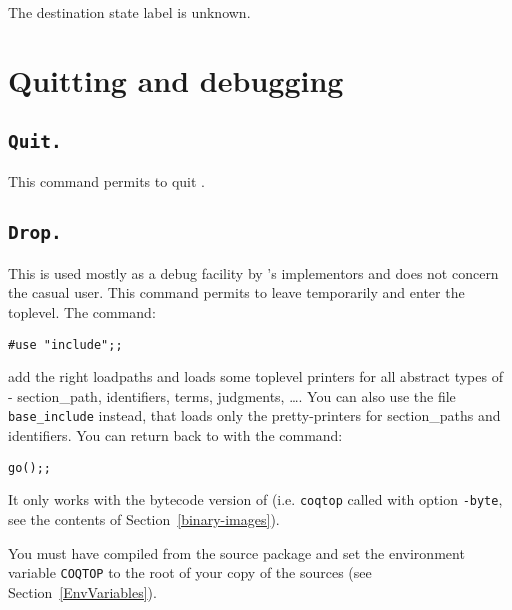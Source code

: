 \begin{ErrMsgs}
\item {} \\
  The destination state label is unknown.
\end{ErrMsgs}

\section{Quitting and debugging}

\subsection[\tt Quit.]{\tt Quit.}
This command permits to quit \Coq.

\subsection[\tt Drop.]{\tt Drop.\label{Drop}}

This is used mostly as a debug facility by \Coq's implementors
and does not concern the casual user.
This command permits to leave {\Coq} temporarily and enter the
{\ocaml} toplevel. The {\ocaml} command:

\begin{flushleft}
\begin{verbatim}
#use "include";;
\end{verbatim}
\end{flushleft}

\noindent add the right loadpaths and loads some toplevel printers for
all abstract types of \Coq - section\_path, identifiers, terms, judgments,
\dots. You can also use the file \texttt{base\_include} instead,
that loads only the pretty-printers for section\_paths and
identifiers.
You can return back to \Coq{} with the command: 

\begin{flushleft}
\begin{verbatim}
go();;
\end{verbatim}
\end{flushleft}

\begin{Warnings}
\item It only works with the bytecode version of {\Coq} (i.e. {\tt coqtop} called with option {\tt -byte}, see the contents of Section~\ref{binary-images}).
\item You must have compiled {\Coq} from the source package and set the
  environment variable \texttt{COQTOP} to the root of your copy of the sources (see Section~\ref{EnvVariables}).
\end{Warnings}


